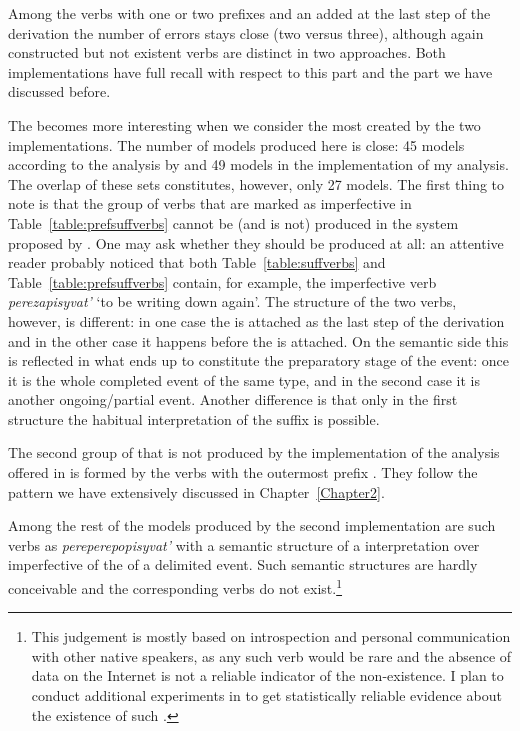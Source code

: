 Among the verbs with one or two prefixes and an  added at the last step of the derivation the number of errors stays close (two versus three), although again constructed but not existent verbs are distinct in two approaches. Both implementations have full recall with respect to this part and the part we have discussed before.

The  becomes more interesting when  we consider the most  created by the two implementations. The number of models produced here is close: 45 models according to the analysis by \citet{Tatevosov:09} and 49 models in the implementation of my analysis. The overlap of these sets constitutes, however, only 27 models. The first thing to note is that the group of verbs that are marked as imperfective in Table~\ref{table:prefsuffverbs} cannot be (and is not) produced in the system proposed by \citet{Tatevosov:09}. One may ask whether they should be produced at all: an attentive reader probably noticed that both Table~\ref{table:suffverbs} and Table~\ref{table:prefsuffverbs} contain, for example, the imperfective verb \textit{perezapisyvat'} `to be writing down again'. The structure of the two verbs, however, is different: in one case the  is attached as the last step of the derivation and in the other case it happens before the   is attached. On the semantic side this is reflected in what ends up to constitute the preparatory stage of the event: once it is the whole completed event of the same type, and in the second case it is another ongoing/partial event. Another difference is that only in the first structure the habitual interpretation of the suffix is possible. 

The second group of  that is not produced by the implementation of the analysis offered in \citealt{Tatevosov:09} is formed by the verbs with the outermost prefix . They follow the pattern we have extensively discussed in Chapter~\ref{Chapter2}.

Among the rest of the models produced by the second implementation are such verbs as \textit{pereperepopisyvat'} with a semantic structure of a  interpretation over imperfective of the  of a delimited event. Such semantic structures are hardly conceivable and the corresponding verbs do not exist.\footnote{This judgement is mostly based on introspection and personal communication with other native speakers, as any such verb would be rare and the absence of data on the Internet is not a reliable indicator of the non-existence. I plan to conduct additional experiments in  to get statistically reliable evidence about the existence of such .}

